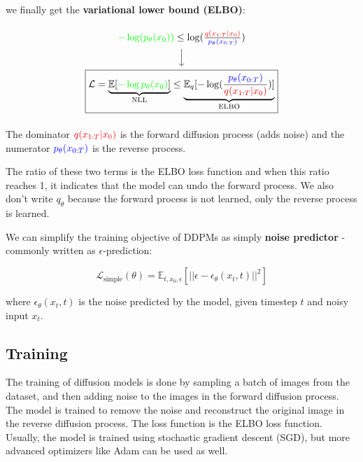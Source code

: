 we finally get the \textbf{variational lower bound (ELBO)}:

\[
\begin{tikzcd}
    \textcolor{green}{-\log(p_\theta(x_0))} \leq \log(\frac{\textcolor{red}{q(x_{1:T} | x_0)}}{\textcolor{blue}{p_\theta(x_{0:T})}})
    \arrow[d, ""] \\
    \boxed{
        \mathcal{L} = 
        \underbrace{\mathbb{E}[
            \textcolor{green}{-\log p_\theta (x_0)}
        ] }_{\text{NLL}}
        \leq 
        \underbrace{\mathbb{E}_q[-\log (\frac{
            \textcolor{blue}{p_\theta(x_{0:T})}
        }{
            \textcolor{red}{q(x_{1:T}|x_0)}})]}_{\text{ELBO}
        }
    }
\end{tikzcd}
\]

The dominator $\textcolor{red}{q(x_{1:T}|x_0)}$ is the forward diffusion process (adds noise) and the numerator $\textcolor{blue}{p_\theta(x_{0:T})}$ is the reverse process. 

The ratio of these two terms is the ELBO loss function and when this ratio reaches 1, it indicates that the model can undo the forward process. We also don't write $q_\theta$ because the forward process is not learned, only the reverse process is learned.

We can simplify the training objective of DDPMs as simply \textbf{noise predictor} - commonly written as $\epsilon$-prediction:

\begin{equation}
    \boxed{\mathcal{L}_\text{simple} (\theta) = \mathbb{E}_{t,x_0, \epsilon} \left[ \left| \left| \epsilon - \epsilon_\theta (x_t, t) \right| \right|^2 \right]}
    \label{eq:ddpm_loss}
\end{equation}

where $\epsilon_\theta (x_t, t)$ is the noise predicted by the model, given timestep $t$ and noisy input $x_t$.







\subsection{Training}

The training of diffusion models is done by sampling a batch of images from the dataset, and then adding noise to the images in the forward diffusion process. The model is trained to remove the noise and reconstruct the original image in the reverse diffusion process. The loss function is the ELBO loss function. Usually, the model is trained using stochastic gradient descent (SGD), but more advanced optimizers like Adam can be used as well.

